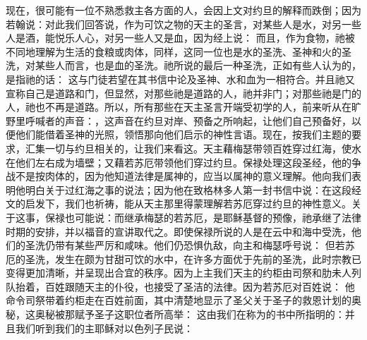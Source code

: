 现在，很可能有一位不熟悉救主各方面的人，会因上文对约旦的解释而跌倒；因为若翰说：对此我们回答说，作为可饮之物的天主的圣言，对某些人是水，对另一些人是酒，能悦乐人心，对另一些人又是血，因为经上说： 而且，作为食物，祂被不同地理解为生活的食粮或肉体，同样，这同一位也是水的圣洗、圣神和火的圣洗，对某些人而言，也是血的圣洗。祂所说的最后一种圣洗，正如有些人认为的，是指祂的话： 这与门徒若望在其书信中论及圣神、水和血为一相符合。并且祂又宣称自己是道路和门，但显然，对那些祂是道路的人，祂并非门；对那些祂是门的人，祂也不再是道路。所以，所有那些在天主圣言开端受初学的人，前来听从在旷野里呼喊者的声音：，这声音在约旦对岸、预备之所响起，让他们自己预备好，以便他们能借着圣神的光照，领悟那向他们启示的神性言语。现在，按我们主题的要求，汇集一切与约旦相关的，让我们来看这。天主藉梅瑟带领百姓穿过红海，使水在他们左右成为墙壁；又藉若苏厄带领他们穿过约旦。保禄处理这段圣经，他的争战不是按肉体的，因为他知道法律是属神的，应当以属神的意义理解。他向我们表明他明白关于过红海之事的说法；因为他在致格林多人第一封书信中说：在这段经文的启发下，我们也祈祷，能从天主那里得蒙理解若苏厄穿过约旦的神性意义。关于这事，保禄也可能说：而继承梅瑟的若苏厄，是耶稣基督的预像，祂承继了法律时期的安排，并以福音的宣讲取代之。即使保禄所说的人是在云中和海中受洗，他们的圣洗仍带有某些严厉和咸味。他们仍恐惧仇敌，向主和梅瑟呼号说： 但若苏厄的圣洗，发生在颇为甘甜可饮的水中，在许多方面优于先前的圣洗，此时宗教已变得更加清晰，并呈现出合宜的秩序。因为上主我们天主的约柜由司祭和肋未人列队抬着，百姓跟随天主的仆役，也接受了圣洁的法律。因为若苏厄对百姓说： 他命令司祭带着约柜走在百姓前面，其中清楚地显示了圣父关于圣子的救恩计划的奥秘，这奥秘被那赋予圣子这职位者所高举： 这由我们在称为的书中所指明的：并且我们听到我们的主耶稣对以色列子民说： 
